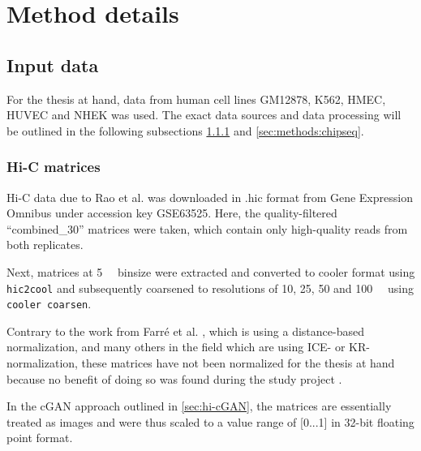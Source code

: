\section{Method details}
\subsection{Input data}
For the thesis at hand, data from human cell lines GM12878, K562, HMEC, HUVEC and NHEK was used.
The exact data sources and data processing will be outlined in the following subsections \ref{sec:methods:hicMatrices} and \ref{sec:methods:chipseq}.


\subsubsection{Hi-C matrices} \label{sec:methods:hicMatrices}
Hi-C data due to Rao et al. \cite{Rao2014} was downloaded 
in .hic format from Gene Expression Omnibus under accession key GSE63525.
Here, the quality-filtered ``combined\_30'' matrices were taken, which contain only high-quality reads from 
both replicates.

Next, matrices at \SI{5}{\kilo\bp} binsize were extracted and converted to cooler format using \texttt{hic2cool}
and subsequently coarsened to resolutions of 10, 25, 50 and \SI{100}{\kilo\bp} using \texttt{cooler coarsen}.

Contrary to the work from Farr\'e et al. \cite{Farre2018a}, which is using a distance-based normalization,
and many others in the field which are using ICE- or KR-normalization, 
these matrices have not been normalized for the thesis at hand
because no benefit of doing so was found during the study project \cite{Krauth2020}.

In the cGAN approach outlined in \cref{sec:hi-cGAN}, the matrices are essentially treated as images and were
thus scaled to a value range of [0...1] in 32-bit floating point format.

